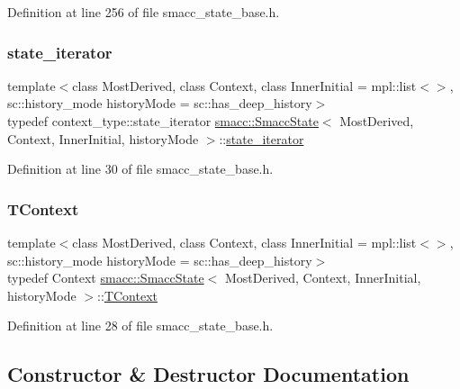 Definition at line 256 of file smacc\+\_\+state\+\_\+base.\+h.

\mbox{\label{classsmacc_1_1SmaccState_a12497b38e710f07cacb5d45efc024339}} 
\subsubsection{\texorpdfstring{state\+\_\+iterator}{state\_iterator}}
{\footnotesize\ttfamily template$<$class Most\+Derived, class Context, class Inner\+Initial = mpl\+::list$<$$>$, sc\+::history\+\_\+mode history\+Mode = sc\+::has\+\_\+deep\+\_\+history$>$ \\
typedef context\+\_\+type\+::state\+\_\+iterator \hyperlink{classsmacc_1_1SmaccState}{smacc\+::\+Smacc\+State}$<$ Most\+Derived, Context, Inner\+Initial, history\+Mode $>$\+::\hyperlink{classsmacc_1_1SmaccState_a12497b38e710f07cacb5d45efc024339}{state\+\_\+iterator}}



Definition at line 30 of file smacc\+\_\+state\+\_\+base.\+h.

\mbox{\label{classsmacc_1_1SmaccState_a9953ba0428a8c46f7d72c70bc3f87db4}} 
\subsubsection{\texorpdfstring{T\+Context}{TContext}}
{\footnotesize\ttfamily template$<$class Most\+Derived, class Context, class Inner\+Initial = mpl\+::list$<$$>$, sc\+::history\+\_\+mode history\+Mode = sc\+::has\+\_\+deep\+\_\+history$>$ \\
typedef Context \hyperlink{classsmacc_1_1SmaccState}{smacc\+::\+Smacc\+State}$<$ Most\+Derived, Context, Inner\+Initial, history\+Mode $>$\+::\hyperlink{classsmacc_1_1SmaccState_a9953ba0428a8c46f7d72c70bc3f87db4}{T\+Context}}



Definition at line 28 of file smacc\+\_\+state\+\_\+base.\+h.



\subsection{Constructor \& Destructor Documentation}
\mbox{\label{classsmacc_1_1SmaccState_a2fbeaca0f063a909d17de2c3040c8d17}} 
